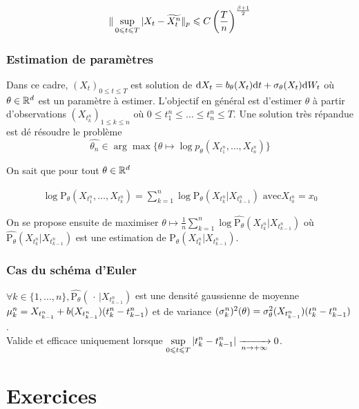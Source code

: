 \[ \Vert \sup_{0 \leqslant t \leqslant T} \vert X_t - \widetilde{X_t^n} \Vert_p \leqslant C \left( \frac{T}{n} \right)^{ \frac{\beta+1}{2} } \]

\subsubsection{Estimation de paramètres}

\renewcommand{\xtkn}{X_{t_k^n}}
\renewcommand{\xtkpn}{X_{t_k^n}}

Dans ce cadre, $(X_t)_{0 \leq t \leq T}$ est solution de $\der X_t = b_\theta(\xt) \der t + \sigma_\theta(\xt) \der \wt$ où $\theta \in \mathbb{R}^d$ est un paramètre à estimer. L'objectif en général est d'estimer $\theta$ à partir d'observations $(\xtkn)_{1 \leq k \leq n}$ où $0 \leq t_1^n \leq \ldots \leq t_n^n \leq T$. Une solution très répandue est dé résoudre le problème 
\[ \hat{\theta_n} \in \arg\max \{ \theta \mapsto \log p_\theta( X_{t_1^n}, \ldots, X_{t_n^n}) \} \]

On sait que pour tout $\theta \in \mathbb{R}^d$ 

\newcommand{\ptheta}{\mathrm{P}_\theta}
\newcommand{\xtkmn}{X_{t_{k-1}^n}}
\begin{equation*}
\begin{split}
  \log \ptheta(X_{t_1^n}, \ldots, \xtkn) = \sum_{k=1}^n \log \ptheta (\xtkn \vert \xtkmn) \text{ avec} X_{t_0^n} = x_0
\end{split}
\end{equation*}

On se propose ensuite de maximiser $\theta \mapsto \frac{1}{n} \sum_{k=1}^n \log \widehat{\ptheta}(\xtkn \vert \xtkmn)$ où $\widehat{\ptheta}(\xtkn \vert \xtkmn)$ est une estimation de $\ptheta(\xtkn\vert\xtkmn)$.

\subsubsection{Cas du schéma d'Euler}
\newcommand{\tkmn}{t_{k-1}^n}
$\forall k \in \{1,\ldots,n\}, \widehat{\ptheta}(\,\cdot\, \vert \xtkmn)$ est une densité gaussienne de moyenne $\mu_k^n = \xtkmn + b(\xtkmn)(\tkn - \tkmn)$ et de variance $(\sigma_k^n)^2(\theta) = \sigma_\theta^2(\xtkmn)(\tkn - \tkmn)$. \\

{\selectfont{}\relax} Valide et efficace uniquement lorsque $\dps \supt \vert \tkn - \tkmn \vert  \xrightarrow[n\to +\infty]{} 0$.

\renewcommand{\xt}{X_t}
\section{Exercices}
